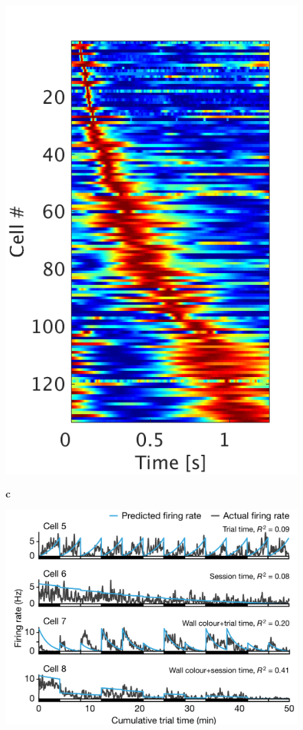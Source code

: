 \documentclass{apa}
\begin{document}
\begin{figure}
\begin{minipage}{\linewidth}
\begin{minipage}{.51\linewidth}
\begin{minipage}{.49\linewidth}
				\includegraphics[width = \linewidth]{figs/HPC_Cruzado_Stretched_longer.png}
			\end{minipage}
			\begin{minipage}{\linewidth}
				\textbf{c}
				\begin{center}
					\includegraphics[width = \linewidth]{figs/TsaoFig.png}

\end{center}
\end{minipage}
\end{minipage}
\end{minipage}
\end{figure}
\end{document}
